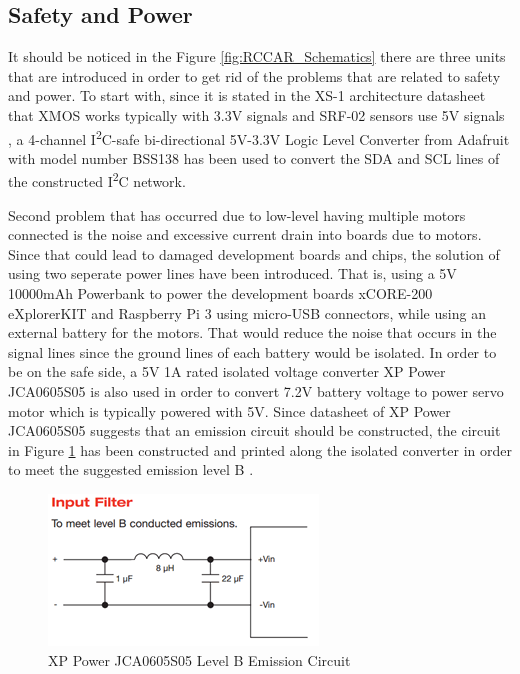 \subsection{Safety and Power}
It should be noticed in the Figure \ref{fig:RCCAR_Schematics} there are three units that are introduced in order to get rid of the problems that are related to safety and power. To start with, since it is stated in the XS-1 architecture datasheet \cite{xmosdatasheet} that XMOS works typically with 3.3V signals and SRF-02 sensors use 5V signals \cite{srf02datasheet}, a 4-channel I\textsuperscript{2}C-safe bi-directional 5V-3.3V Logic Level Converter from Adafruit with model number BSS138 \cite{adafruitlevelconverter} has been used to convert the SDA and SCL lines of the constructed I\textsuperscript{2}C network. 

Second problem that has occurred due to low-level having multiple motors connected is the noise and excessive current drain into boards due to motors. Since that could lead to damaged development boards and chips, the solution of using two seperate power lines have been introduced. That is, using a 5V 10000mAh Powerbank to power the development boards xCORE-200 eXplorerKIT and Raspberry Pi 3 using micro-USB connectors, while using an external battery for the motors. That would reduce the noise that occurs in the signal lines since the ground lines of each battery would be isolated. In order to be on the safe side, a 5V 1A rated isolated voltage converter XP Power JCA0605S05 \cite{isolatedvoltageconverter} is also used in order to convert 7.2V battery voltage to power servo motor which is typically powered with 5V. Since datasheet of XP Power JCA0605S05 suggests that an emission circuit should be constructed, the circuit in Figure \ref{fig:emissionckt} has been constructed and printed along the isolated converter in order to meet the suggested emission level B \cite{isolatedvoltageconverter}.
\begin{figure}[!ht]
	\centering
	\captionsetup{justification=centering}
	\includegraphics[scale=1.5]{content/images/emissionckt.png}
	\caption{XP Power JCA0605S05 Level B Emission Circuit \cite{isolatedvoltageconverter}}
	\label{fig:emissionckt}
\end{figure}

